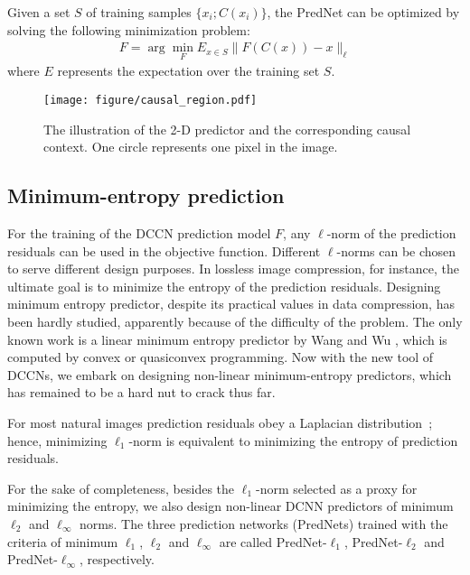 \documentclass{article}
\begin{document}
Given a set $S$ of training samples $\{ x_i ; C(x_i) \}$, the PredNet can be optimized by solving the following minimization problem:
\begin{align}
	F = \arg \min_F E_{x\in S} \| F(C(x)) - x \|_\ell
\end{align}
where $E$ represents the expectation over the training set $S$.

\begin{figure}
	\centering
	\texttt{[image: figure/causal\_region.pdf]}
	\caption{The illustration of the 2-D predictor and the corresponding causal context. One circle represents one pixel in the image. }
	\label{fig:causal}
\end{figure}


\subsection{Minimum-entropy prediction}
For the training of the DCCN prediction model $F$, any $\ell$-norm of the prediction residuals can be used in the objective function.  Different $\ell$-norms can be chosen to serve different design purposes.  In lossless image compression, for instance, the ultimate goal is to minimize the entropy of the prediction residuals.  Designing minimum entropy predictor, despite its practical values in data compression, has been hardly studied, apparently because of the difficulty of the problem.  The only known work is a linear minimum entropy predictor by Wang and Wu \cite{wang2007}, which is computed by convex or quasiconvex programming.  Now with the new tool of DCCNs, we embark on designing non-linear minimum-entropy predictors, which has remained to be a hard nut to crack thus far.

For most natural images prediction residuals obey a Laplacian distribution~\cite{laplacian}; hence, minimizing $\ell_1$-norm is equivalent to minimizing the entropy of prediction residuals.

For the sake of completeness, besides the $\ell_1$-norm selected as a proxy for minimizing the entropy, we also design non-linear DCNN predictors of minimum $\ell_2$ and $\ell_\infty$ norms. The three prediction networks (PredNets) trained with the criteria of minimum $\ell_1$, $\ell_2$ and $\ell_\infty$ are called PredNet-$\ell_1$, PredNet-$\ell_2$ and PredNet-$\ell_\infty$, respectively.
\end{document}
